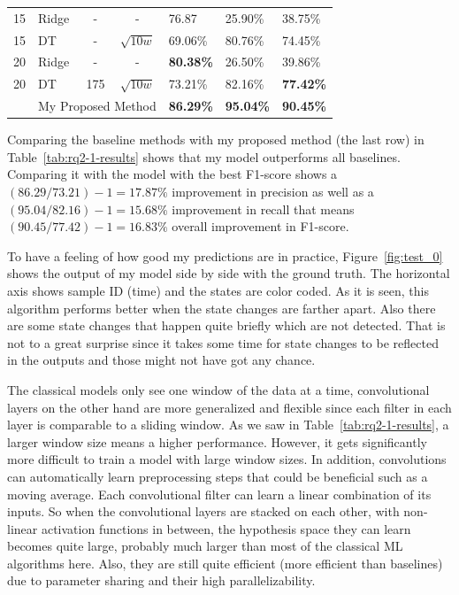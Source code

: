 \begin{table}
{\begin{tabular}{clcclll}
15 & Ridge & -   & -          & 76.87 & 25.90\% & 38.75\% \\
15 & DT    & -   & $\sqrt{10w}$ & 69.06\% & 80.76\% & 74.45\% \\ \midrule
20 & Ridge & -   & -          & \textbf{80.38\%} & 26.50\% & 39.86\% \\
20 & DT    & 175 & $\sqrt{10w}$ & 73.21\% & 82.16\% & \textbf{77.42\%} \\  \midrule
   & \multicolumn{3}{l}{My Proposed Method} & \textbf{86.29\%} & \textbf{95.04\%} & \textbf{90.45\%} \\
\bottomrule
\end{tabular}%
}
\end{table}

Comparing the baseline methods with my proposed method (the last row) in Table~\ref{tab:rq2-1-results} shows that my model outperforms all baselines. Comparing it with the model with the best F1-score shows a $(86.29/73.21)-1=17.87\%$ improvement in precision as well as a $(95.04/82.16)-1=15.68\%$ improvement in recall that means $(90.45/77.42)-1=16.83\%$ overall improvement in F1-score. 

To have a feeling of how good my predictions are in practice, Figure~\ref{fig:test_0} shows the output of my model side by side with the ground truth. The horizontal axis shows sample ID (time) and the states are color coded. As it is seen, this algorithm performs better when the state changes are farther apart. Also there are some state changes that happen quite briefly which are not detected. That is not to a great surprise since it takes some time for state changes to be reflected in the outputs and those might not have got any chance.


The classical models only see one window of the data at a time, convolutional layers on the other hand are more generalized and flexible since each filter in each layer is comparable to a sliding window. As we saw in Table~\ref{tab:rq2-1-results}, a larger window size means a higher performance. However, it gets significantly more difficult to train a model with large window sizes. In addition, convolutions can automatically learn preprocessing steps that could be beneficial such as a moving average. Each convolutional filter can learn a linear combination of its inputs. So when the convolutional layers are stacked on each other, with non-linear activation functions in between, the hypothesis space they can learn becomes quite large, probably much larger than most of the classical ML algorithms here. Also, they are still quite efficient (more efficient than baselines) due to parameter sharing and their high parallelizability.

